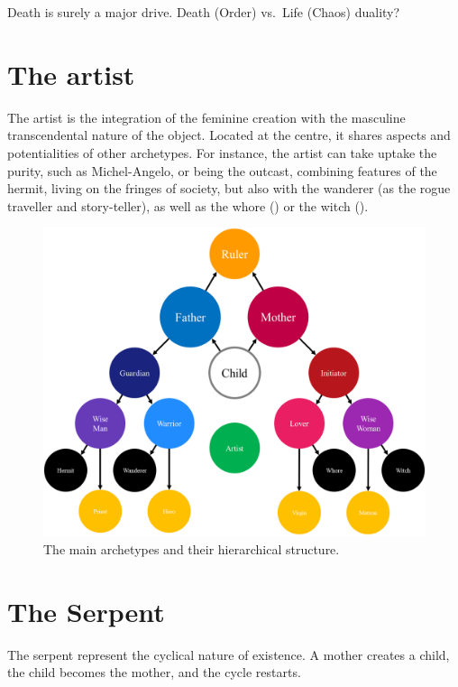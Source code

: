 \documentclass[
]{book}
\begin{document}
Death is surely a major drive. Death (Order) vs.~Life (Chaos) duality?

\hypertarget{the-artist}{%
\section{The artist}\label{the-artist}}

The artist is the integration of the feminine creation with the masculine transcendental nature of the object. Located at the centre, it shares aspects and potentialities of other archetypes. For instance, the artist can take uptake the purity, such as Michel-Angelo, or being the outcast, combining features of the hermit, living on the fringes of society, but also with the wanderer (as the rogue traveller and story-teller), as well as the whore () or the witch ().

\begin{figure}

{\centering \includegraphics[width=\textwidth]{img/archetypes} 

}

\caption{The main archetypes and their hierarchical structure.}\label{fig:unnamed-chunk-16}
\end{figure}

\hypertarget{the-serpent}{%
\section{The Serpent}\label{the-serpent}}

The serpent represent the cyclical nature of existence. A mother creates a child, the child becomes the mother, and the cycle restarts.
\end{document}
